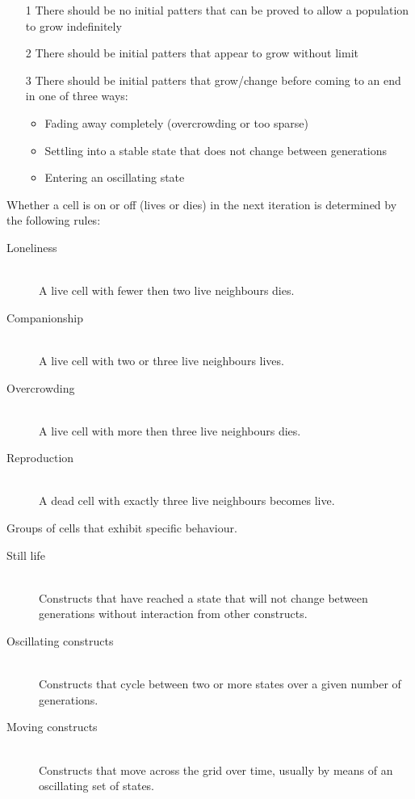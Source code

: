 \documentclass[a4paper]{article}
\begin{document}
\begin{enumerate}
  \item[1] There should be no initial patters that can be proved to allow a
           population to grow indefinitely
  \item[2] There should be initial patters that appear to grow without limit
  \item[3] There should be initial patters that grow/change before coming to an
           end in one of three ways:
    \begin{itemize}
      \item Fading away completely (overcrowding or too sparse)
      \item Settling into a stable state that does not change between
            generations
      \item Entering an oscillating state
    \end{itemize}
\end{enumerate}


Whether a cell is on or off (lives or dies) in the next iteration is determined
by the following rules:

\begin{description}
  \item[Loneliness] \hfill \\
    A live cell with fewer then two live neighbours dies.
  \item[Companionship] \hfill \\
    A live cell with two or three live neighbours lives.
  \item[Overcrowding] \hfill \\
    A live cell with more then three live neighbours dies.
  \item[Reproduction] \hfill \\
    A dead cell with exactly three live neighbours becomes live.
\end{description}


Groups of cells that exhibit specific behaviour.

\begin{description}
  \item[Still life] \hfill \\
    Constructs that have reached a state that will not change between
    generations without interaction from other constructs.
  \item[Oscillating constructs] \hfill \\
    Constructs that cycle between two or more states over a given number of
    generations.
  \item[Moving constructs] \hfill \\
    Constructs that move across the grid over time, usually by means of an
    oscillating set of states.
\end{description}
\end{document}
